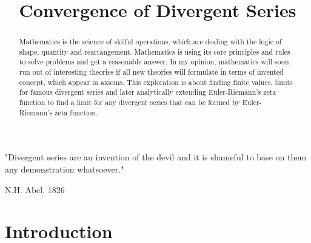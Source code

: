 \documentclass{beamer}
\title{Convergence of Divergent Series}
\date{}
\author{}
\begin{document}
\maketitle
\tableofcontents
\listoffigures
\listoftables
\newpage

 \begin{center}
 "Divergent series are an invention of the devil and it is shameful
to base on them any demonstration whatsoever."\cite{Abel}
 \end{center}
 \begin{flushright}
   N.H. Abel. 1826
   \end{flushright}


\begin{abstract}
    Mathematics is the science of skilful operations, which are dealing with the logic of shape, quantity
and rearrangement. Mathematics is using its core principles and rules to solve problems and get a
reasonable answer. In my opinion, mathematics will soon run out of interesting theories if all new
theories will formulate in terms of invented concept, which appear in axioms. This exploration is
about finding finite values, limits for famous divergent series and later analytically extending
Euler-Riemann's zeta function to find a limit for any divergent series that can be formed by Euler-
Riemann's zeta function.
\end{abstract}

\section{Introduction}
\end{document}
